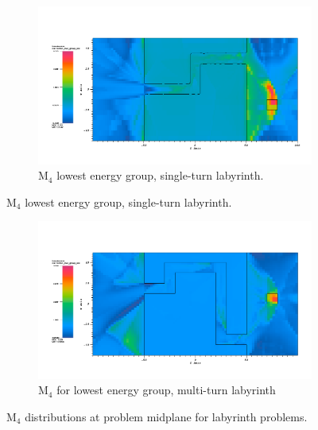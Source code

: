\begin{figure}[htb!]
  \centering
  \begin{subfigure}[t]{\textwidth}
    \includegraphics[width=0.9\linewidth]{./chapters/characterization_probs/figures/char/maze2/maze2M4G26.png}
    \caption{M$_4$ lowest energy group, single-turn
    labyrinth.}
    \label{fig:maze2M4}
  \end{subfigure}
\end{figure}
\begin{figure}[htb!]\ContinuedFloat
  \centering
  \begin{subfigure}[t]{\textwidth}
    \includegraphics[width=0.9\linewidth]{./chapters/characterization_probs/figures/char/maze1/maze1M4G026.png}
    \caption{M$_4$ for lowest energy group, multi-turn labyrinth }
    \label{fig:maze1M4}
  \end{subfigure}
  \caption[M$_4$ distributions at problem midplane for labyrinth problems]{M$_4$
  distributions at problem midplane for labyrinth problems.}
  \label{fig:labyrinthM4}
\end{figure}

